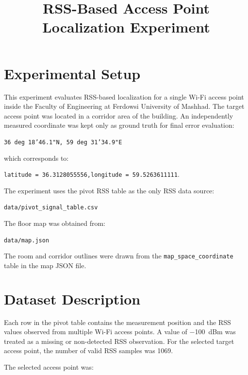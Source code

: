 \documentclass[11pt,a4paper]{article}
\title{RSS-Based Access Point Localization Experiment}
\author{}
\date{}
\begin{document}
\maketitle

\section{Experimental Setup}

This experiment evaluates RSS-based localization for a single Wi-Fi access point
inside the Faculty of Engineering at Ferdowsi University of Mashhad. The target
access point was located in a corridor area of the building. An independently
measured coordinate was kept only as ground truth for final error evaluation:

\begin{center}
\texttt{36 deg 18'46.1"N, 59 deg 31'34.9"E}
\end{center}

which corresponds to:

\begin{center}
\texttt{latitude = 36.3128055556,\quad longitude = 59.5263611111}.
\end{center}

The experiment uses the pivot RSS table as the only RSS data source:

\begin{center}
\texttt{data/pivot\_signal\_table.csv}
\end{center}

The floor map was obtained from:

\begin{center}
\texttt{data/map.json}
\end{center}

The room and corridor outlines were drawn from the \texttt{map\_space\_coordinate}
table in the map JSON file.

\section{Dataset Description}

Each row in the pivot table contains the measurement position and the RSS values
observed from multiple Wi-Fi access points. A value of \SI{-100}{dBm} was treated
as a missing or non-detected RSS observation. For the selected target access
point, the number of valid RSS samples was 1069.

The selected access point was:
\end{document}
